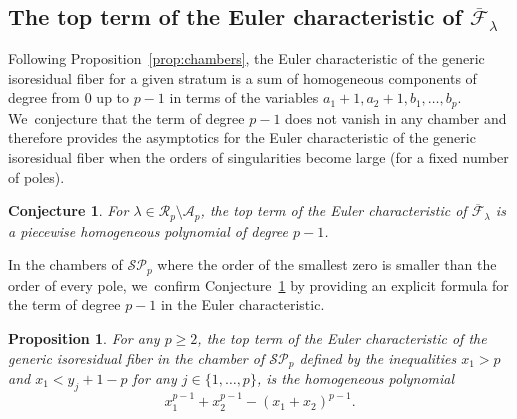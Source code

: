 \documentclass[11pt]{article}
\newtheorem{prop}[thm]{Proposition}
\newtheorem{conj}[thm]{Conjecture}
\theoremstyle{definition}
\begin{document}
\subsection{The top term of the Euler characteristic of $\overline{\mathcal F}_\lambda$}\label{sub:Euler}

Following Proposition~\ref{prop:chambers}, the Euler characteristic of the generic isoresidual fiber for a given stratum is a sum of homogeneous components of degree from $0$ up to $p-1$ in terms of the variables $a_{1}+1,a_{2}+1,b_{1},\dots,b_{p}$. We~conjecture that the term of degree $p-1$ does not vanish in any chamber and therefore provides the asymptotics for the Euler characteristic of the generic isoresidual fiber when the orders of singularities become large (for a fixed number of poles).

\begin{conj}\label{conj:Euler}
For $\lambda \in \mathcal{R}_{p} \setminus \mathcal{A}_{p}$, the top term of the Euler characteristic of $\overline{\mathcal F}_\lambda$ is a piecewise homogeneous polynomial of degree $p-1$.
\end{conj}

In the chambers of $\mathcal{SP}_{p}$ where the order of the smallest zero is smaller than the order of every pole, we~confirm Conjecture~\ref{conj:Euler} by providing an explicit formula for the term of degree $p-1$ in the Euler characteristic.

\begin{prop}
\label{prop:one-chamber}
For any $p \geq 2$, the top term of the Euler characteristic of the generic isoresidual fiber in the chamber of $\mathcal{SP}_{p}$ defined by the inequalities $x_{1}>p$ and $x_{1}<y_{j} +1-p$ for any $j \in \lbrace{ 1,\dots,p \rbrace}$, is the homogeneous polynomial
\[
x_{1}^{p-1}+x_{2}^{p-1}-(x_{1}+x_{2})^{p-1}.
\]
\end{prop}
\end{document}
